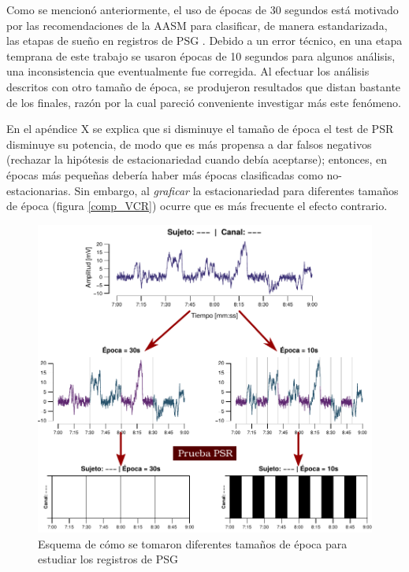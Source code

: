 Como se mencionó anteriormente, el uso de épocas de 30 segundos está motivado por las 
recomendaciones de la AASM para clasificar, de manera estandarizada, las etapas de sueño en
registros de PSG \cite{AASM07}. 
Debido a un error técnico, en una etapa temprana de este trabajo se usaron épocas de 10 segundos 
para algunos análisis, una inconsistencia que eventualmente fue corregida.
Al efectuar los análisis descritos con otro tamaño de época, se produjeron resultados que distan
bastante de los finales, razón por la cual pareció conveniente investigar más este fenómeno.

En el apéndice X se explica que si disminuye el tamaño de época el test de PSR disminuye su 
potencia, de modo que es más propensa a dar falsos negativos (rechazar la hipótesis de 
estacionariedad cuando debía aceptarse); entonces, en épocas más pequeñas debería haber más épocas 
clasificadas como no-estacionarias.
Sin embargo, al \textit{graficar} la estacionariedad para diferentes tamaños de época (figura
\ref{comp_VCR}) ocurre que es más frecuente el efecto contrario.

\begin{figure}
\centering
\includegraphics[width=\linewidth]{./img_diagramas/epocas_diferentes_v2.pdf}
\caption{Esquema de cómo se tomaron diferentes tamaños de época para estudiar los registros de 
PSG}
\label{epocas_diferentes}
\end{figure}

